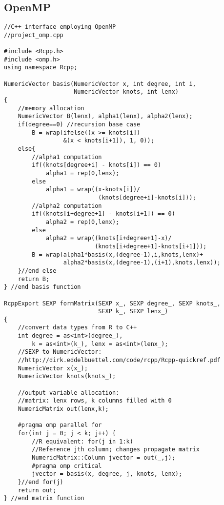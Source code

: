 \subsection{OpenMP} %
\lstset{language=C++}
\begin{lstlisting}
//C++ interface employing OpenMP
//project_omp.cpp

#include <Rcpp.h>
#include <omp.h>
using namespace Rcpp;

NumericVector basis(NumericVector x, int degree, int i,
                    NumericVector knots, int lenx)
{
    //memory allocation
    NumericVector B(lenx), alpha1(lenx), alpha2(lenx);
    if(degree==0) //recursion base case
        B = wrap(ifelse((x >= knots[i])
                 &(x < knots[i+1]), 1, 0));
    else{
        //alpha1 computation
        if((knots[degree+i] - knots[i]) == 0)
            alpha1 = rep(0,lenx);
        else
            alpha1 = wrap((x-knots[i])/
                           (knots[degree+i]-knots[i]));
        //alpha2 computation
        if((knots[i+degree+1] - knots[i+1]) == 0)
            alpha2 = rep(0,lenx);
        else
            alpha2 = wrap((knots[i+degree+1]-x)/
                          (knots[i+degree+1]-knots[i+1]));
        B = wrap(alpha1*basis(x,(degree-1),i,knots,lenx)+
                 alpha2*basis(x,(degree-1),(i+1),knots,lenx));
    }//end else
    return B;
} //end basis function

RcppExport SEXP formMatrix(SEXP x_, SEXP degree_, SEXP knots_,
                           SEXP k_, SEXP lenx_)
{
    //convert data types from R to C++
    int degree = as<int>(degree_),
        k = as<int>(k_), lenx = as<int>(lenx_);
    //SEXP to NumericVector:
    //http://dirk.eddelbuettel.com/code/rcpp/Rcpp-quickref.pdf
    NumericVector x(x_);
    NumericVector knots(knots_);

    //output variable allocation:
    //matrix: lenx rows, k columns filled with 0
    NumericMatrix out(lenx,k);

    #pragma omp parallel for
    for(int j = 0; j < k; j++) {
        //R equivalent: for(j in 1:k)
        //Reference jth column; changes propagate matrix
        NumericMatrix::Column jvector = out(_,j);
        #pragma omp critical
        jvector = basis(x, degree, j, knots, lenx);
    }//end for(j)
    return out;
} //end matrix function
\end{lstlisting}

